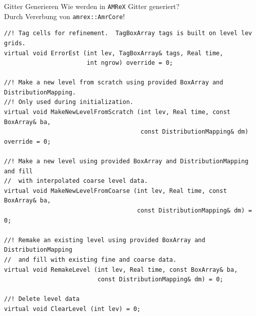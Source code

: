 \documentclass[ucs,9pt]{beamer}
\begin{document}
\begin{frame}[fragile]{Gitter Generieren}
Wie werden in \texttt{AMReX} Gitter generiert?\pause\\
Durch Vererbung von \texttt{amrex::AmrCore}!
\pause
\begin{lstlisting}
//! Tag cells for refinement.  TagBoxArray tags is built on level lev grids.
virtual void ErrorEst (int lev, TagBoxArray& tags, Real time,
                       int ngrow) override = 0;

//! Make a new level from scratch using provided BoxArray and DistributionMapping.
//! Only used during initialization.
virtual void MakeNewLevelFromScratch (int lev, Real time, const BoxArray& ba,
                                      const DistributionMapping& dm) override = 0;

//! Make a new level using provided BoxArray and DistributionMapping and fill
//  with interpolated coarse level data.
virtual void MakeNewLevelFromCoarse (int lev, Real time, const BoxArray& ba,
                                     const DistributionMapping& dm) = 0;

//! Remake an existing level using provided BoxArray and DistributionMapping
//  and fill with existing fine and coarse data.
virtual void RemakeLevel (int lev, Real time, const BoxArray& ba,
                          const DistributionMapping& dm) = 0;

//! Delete level data
virtual void ClearLevel (int lev) = 0;
\end{lstlisting}
\end{frame}
\end{document}
